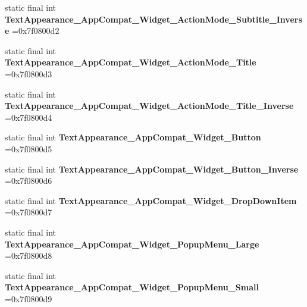 \begin{DoxyCompactItemize}
\item 
\hypertarget{classcheck_1_1test_1_1_r_1_1style_a1f86414ecfc4db5dab0ef458b742b406}{}static final int {\bfseries Text\+Appearance\+\_\+\+App\+Compat\+\_\+\+Widget\+\_\+\+Action\+Mode\+\_\+\+Subtitle\+\_\+\+Inverse} =0x7f0800d2\label{classcheck_1_1test_1_1_r_1_1style_a1f86414ecfc4db5dab0ef458b742b406}

\item 
\hypertarget{classcheck_1_1test_1_1_r_1_1style_a5b75ed3e26f13e60b547b92a034f28ad}{}static final int {\bfseries Text\+Appearance\+\_\+\+App\+Compat\+\_\+\+Widget\+\_\+\+Action\+Mode\+\_\+\+Title} =0x7f0800d3\label{classcheck_1_1test_1_1_r_1_1style_a5b75ed3e26f13e60b547b92a034f28ad}

\item 
\hypertarget{classcheck_1_1test_1_1_r_1_1style_a8f5363d5e99bc7d6d7cd0b3047f51184}{}static final int {\bfseries Text\+Appearance\+\_\+\+App\+Compat\+\_\+\+Widget\+\_\+\+Action\+Mode\+\_\+\+Title\+\_\+\+Inverse} =0x7f0800d4\label{classcheck_1_1test_1_1_r_1_1style_a8f5363d5e99bc7d6d7cd0b3047f51184}

\item 
\hypertarget{classcheck_1_1test_1_1_r_1_1style_ad75f5b5e2650e6ffb49663495bb34b7c}{}static final int {\bfseries Text\+Appearance\+\_\+\+App\+Compat\+\_\+\+Widget\+\_\+\+Button} =0x7f0800d5\label{classcheck_1_1test_1_1_r_1_1style_ad75f5b5e2650e6ffb49663495bb34b7c}

\item 
\hypertarget{classcheck_1_1test_1_1_r_1_1style_acd8e01de8aec1b21f9da4583720acee7}{}static final int {\bfseries Text\+Appearance\+\_\+\+App\+Compat\+\_\+\+Widget\+\_\+\+Button\+\_\+\+Inverse} =0x7f0800d6\label{classcheck_1_1test_1_1_r_1_1style_acd8e01de8aec1b21f9da4583720acee7}

\item 
\hypertarget{classcheck_1_1test_1_1_r_1_1style_a0b2d9df7e89e688a2e61e83d00779cdf}{}static final int {\bfseries Text\+Appearance\+\_\+\+App\+Compat\+\_\+\+Widget\+\_\+\+Drop\+Down\+Item} =0x7f0800d7\label{classcheck_1_1test_1_1_r_1_1style_a0b2d9df7e89e688a2e61e83d00779cdf}

\item 
\hypertarget{classcheck_1_1test_1_1_r_1_1style_a1002ad77a04915da1db451af0a57585c}{}static final int {\bfseries Text\+Appearance\+\_\+\+App\+Compat\+\_\+\+Widget\+\_\+\+Popup\+Menu\+\_\+\+Large} =0x7f0800d8\label{classcheck_1_1test_1_1_r_1_1style_a1002ad77a04915da1db451af0a57585c}

\item 
\hypertarget{classcheck_1_1test_1_1_r_1_1style_a0042c9deeaa45b67276ac5c6e4c5a429}{}static final int {\bfseries Text\+Appearance\+\_\+\+App\+Compat\+\_\+\+Widget\+\_\+\+Popup\+Menu\+\_\+\+Small} =0x7f0800d9\label{classcheck_1_1test_1_1_r_1_1style_a0042c9deeaa45b67276ac5c6e4c5a429}


\end{DoxyCompactItemize}
